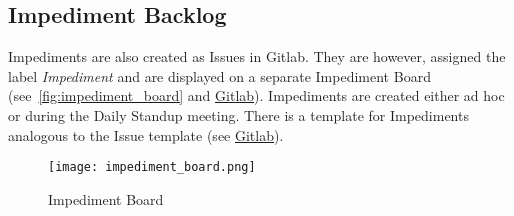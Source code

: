\subsection{Impediment Backlog}\label{subsec:impediment_board}
Impediments are also created as Issues in Gitlab. They are however, assigned the label \textit{Impediment} and are displayed on a separate Impediment Board (see\ \autoref{fig:impediment_board} and \href{https://gitlab.ti.bfh.ch/decibel-threshold-event-displayer/decibel-threshold-event-displayer/-/boards/2834?label_name[]=impediment}{Gitlab}).
Impediments are created either ad hoc or during the Daily Standup meeting. There is a template for Impediments analogous to the Issue template (see \href{https://gitlab.ti.bfh.ch/decibel-threshold-event-displayer/decibel-threshold-event-displayer/-/blob/main/.gitlab/issue_templates/Impediment.md}{Gitlab}).
\begin{figure}[H]
    \centering
    \texttt{[image: impediment\_board.png]}
    \caption{Impediment Board}\label{fig:impediment_board}
\end{figure}
